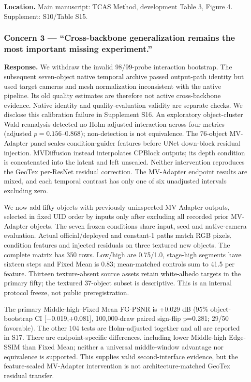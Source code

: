 \documentclass[
  10pt,
]{article}
\begin{document}
\textbf{Location.} Main manuscript: TCAS Method, development Table 3,
Figure 4. Supplement: S10/Table S15.

\hypertarget{concern-3-cross-backbone-generalization-remains-the-most-important-missing-experiment.}{%
\subsubsection{Concern 3 --- ``Cross-backbone generalization remains the
most important missing
experiment.''}\label{concern-3-cross-backbone-generalization-remains-the-most-important-missing-experiment.}}

\textbf{Response.} We withdraw the invalid 98/99-probe interaction
bootstrap. The subsequent seven-object native temporal archive passed
output-path identity but used target cameras and mesh normalization
inconsistent with the native pipeline. Its old quality estimates are
therefore not active cross-backbone evidence. Native identity and
quality-evaluation validity are separate checks. We disclose this
calibration failure in Supplement S16. An exploratory object-cluster
Wald reanalysis detected no Holm-adjusted interaction across four
metrics (adjusted \(p=0.156\)--\(0.868\)); non-detection is not
equivalence. The 76-object MV-Adapter panel scales condition-guider
features before UNet down-block residual injection. MVDiffusion instead
interpolates CPBlock outputs; its depth condition is concatenated into
the latent and left unscaled. Neither intervention reproduces the GeoTex
per-ResNet residual correction. The MV-Adapter endpoint results are
mixed, and each temporal contrast has only one of six unadjusted
intervals excluding zero.

We now add fifty objects with previously uninspected MV-Adapter outputs,
selected in fixed UID order by inputs only after excluding all recorded
prior MV-Adapter objects. The seven frozen conditions share input, seed
and native-camera evaluation. Actual official/deployed and constant-1
paths match RGB pixels, condition features and injected residuals on
three textured new objects. The complete matrix has 350 rows. Low/high
are 0.75/1.0, stage-high segments have sixteen steps and Fixed Mean is
0.83; mean-matched controls sum to 41.5 per feature. Thirteen
texture-absent source assets retain white-albedo targets in the primary
fifty; the textured 37-object subset is descriptive. This is an internal
protocol freeze, not public preregistration.

The primary Middle-high--Fixed Mean FG-PSNR is +0.029 dB (95\%
object-bootstrap CI {[}−0.019,+0.081{]}, 100,000-draw paired sign-flip
p=0.281; 29/50 favorable). The other 104 tests are Holm-adjusted
together and all are reported in S17. There are endpoint-specific
differences, including lower Middle-high Edge-SSIM than Fixed Mean;
neither a universal middle-window advantage nor equivalence is
supported. This supplies valid second-interface evidence, but the
feature-scaled MV-Adapter intervention is not architecture-matched
GeoTex residual transfer.
\end{document}
